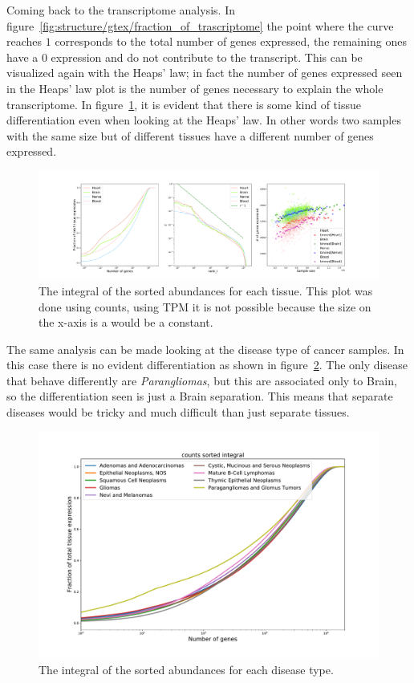 Coming back to the transcriptome analysis. In figure~\ref{fig:structure/gtex/fraction_of_trascriptome} the point where the curve reaches $1$ corresponds to the total number of genes expressed, the remaining ones have a $0$ expression and do not contribute to the transcript. This can be visualized again with the Heaps' law; in fact the number of genes expressed seen in the Heaps' law plot is the number of genes necessary to explain the whole transcriptome. In figure~\ref{fig:structure/gtex/heaps_tissue}, it is evident that there is some kind of tissue differentiation even when looking at the Heaps' law. In other words two samples with the same size but of different tissues have a different number of genes expressed.
\begin{figure}[htb!]
  \centering
  \includegraphics[width=0.5\linewidth]{pictures/structure/gtex/heaps_tissue.pdf}
  \caption{The integral of the sorted abundances for each tissue. This plot was done using counts, using TPM it is not possible because the size on the x-axis is a would be a constant.}
  \label{fig:structure/gtex/heaps_tissue}
\end{figure}
The same analysis can be made looking at the disease type of cancer samples. In this case there is no evident differentiation as shown in figure~\ref{fig:structure/tcga/fraction_of_trascriptome_disease}. The only disease that behave differently are \textit{Parangliomas}, but this are associated only to Brain, so the differentiation seen is just a Brain separation. This means that separate diseases would be tricky and much difficult than just separate tissues.
\begin{figure}[htb!]
  \centering
  \includegraphics[width=0.8\linewidth]{pictures/structure/tcga/fraction_of_trascriptome_disease.pdf}
  \caption{The integral of the sorted abundances for each disease type.}
  \label{fig:structure/tcga/fraction_of_trascriptome_disease}
\end{figure}


